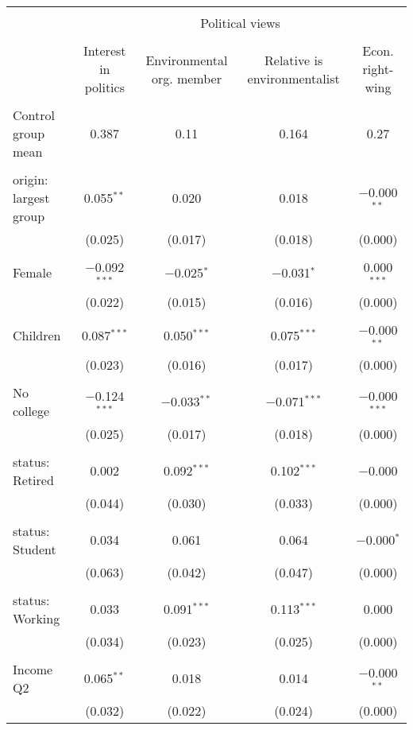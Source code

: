 
\begin{tabular}{@{\extracolsep{5pt}}lcccc} 
\\[-1.8ex]\hline 
\hline \\[-1.8ex] 
 & \multicolumn{4}{c}{Political views} \\ 
\cline{2-5} 
\\[-1.8ex] & Interest in politics & Environmental org. member & Relative is environmentalist & Econ. right-wing \\ 
\hline \\[-1.8ex] 
 Control group mean & 0.387 & 0.11 & 0.164 & 0.27  \\ \hline \\[-1.8ex] origin: largest group & 0.055$^{**}$ & 0.020 & 0.018 & $-$0.000$^{**}$ \\ 
  & (0.025) & (0.017) & (0.018) & (0.000) \\ 
  & & & & \\ 
 Female & $-$0.092$^{***}$ & $-$0.025$^{*}$ & $-$0.031$^{*}$ & 0.000$^{***}$ \\ 
  & (0.022) & (0.015) & (0.016) & (0.000) \\ 
  & & & & \\ 
 Children & 0.087$^{***}$ & 0.050$^{***}$ & 0.075$^{***}$ & $-$0.000$^{**}$ \\ 
  & (0.023) & (0.016) & (0.017) & (0.000) \\ 
  & & & & \\ 
 No college & $-$0.124$^{***}$ & $-$0.033$^{**}$ & $-$0.071$^{***}$ & $-$0.000$^{***}$ \\ 
  & (0.025) & (0.017) & (0.018) & (0.000) \\ 
  & & & & \\ 
 status: Retired & 0.002 & 0.092$^{***}$ & 0.102$^{***}$ & $-$0.000 \\ 
  & (0.044) & (0.030) & (0.033) & (0.000) \\ 
  & & & & \\ 
 status: Student & 0.034 & 0.061 & 0.064 & $-$0.000$^{*}$ \\ 
  & (0.063) & (0.042) & (0.047) & (0.000) \\ 
  & & & & \\ 
 status: Working & 0.033 & 0.091$^{***}$ & 0.113$^{***}$ & 0.000 \\ 
  & (0.034) & (0.023) & (0.025) & (0.000) \\ 
  & & & & \\ 
 Income Q2 & 0.065$^{**}$ & 0.018 & 0.014 & $-$0.000$^{**}$ \\ 
  & (0.032) & (0.022) & (0.024) & (0.000) \\ 

\end{tabular}
